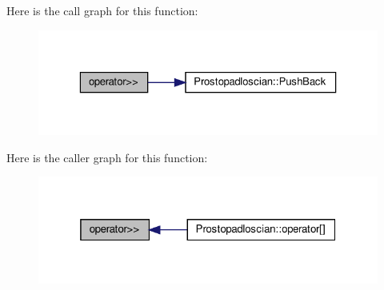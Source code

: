 Here is the call graph for this function\+:
\nopagebreak
\begin{figure}[H]
\begin{center}
\leavevmode
\includegraphics[width=323pt]{_prostopadloscian_8hh_a002ba87e7198bb0f1a42575278b379d8_cgraph}
\end{center}
\end{figure}
Here is the caller graph for this function\+:
\nopagebreak
\begin{figure}[H]
\begin{center}
\leavevmode
\includegraphics[width=319pt]{_prostopadloscian_8hh_a002ba87e7198bb0f1a42575278b379d8_icgraph}
\end{center}
\end{figure}
